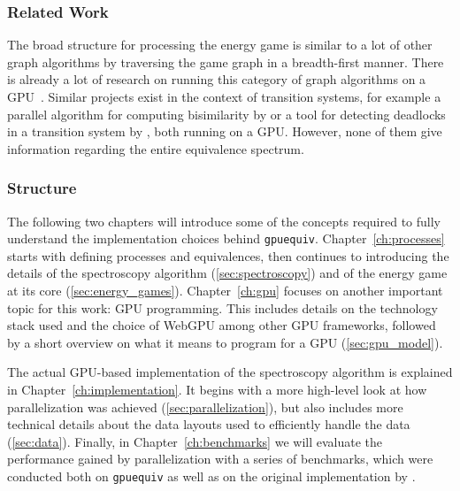 \subsubsection{Related Work}

The broad structure for processing the energy game
is similar to a lot of other graph algorithms
by traversing the game graph in a breadth-first manner.
There is already a lot of research on running this category of graph
algorithms on a GPU~\cite{Merrill2015,Busato2018,Hijma2023}.
Similar projects exist in the context of transition systems,
for example a parallel algorithm for computing bisimilarity
by \textcite{Martens2023}
or a tool for detecting deadlocks in a transition system
by \textcite{Wijs2023},
both running on a GPU\@.
However, none of them give information
regarding the entire equivalence spectrum.

\subsubsection{Structure}

The following two chapters will introduce some of the concepts required to
fully understand the implementation choices behind \texttt{gpuequiv}.
Chapter~\ref{ch:processes} starts with defining processes and equivalences,
then continues to introducing the details of
the spectroscopy algorithm (\ref{sec:spectroscopy})
and of the energy game at its core (\ref{sec:energy_games}).
Chapter~\ref{ch:gpu} focuses on another important topic for this work:
GPU programming.
This includes details on the technology stack used
and the choice of WebGPU among other GPU frameworks,
followed by a short overview on what it means
to program for a GPU (\ref{sec:gpu_model}).

The actual GPU-based implementation of the spectroscopy algorithm is explained
in Chapter~\ref{ch:implementation}.
It begins with a more high-level look at how parallelization was achieved
(\ref{sec:parallelization}),
but also includes more technical details about the data layouts
used to efficiently handle the data (\ref{sec:data}).
Finally, in Chapter~\ref{ch:benchmarks} we will evaluate the performance
gained by parallelization with a series of benchmarks, which were
conducted both on \texttt{gpuequiv} as well as on the original implementation
by \textcite{bisping2023process}.
